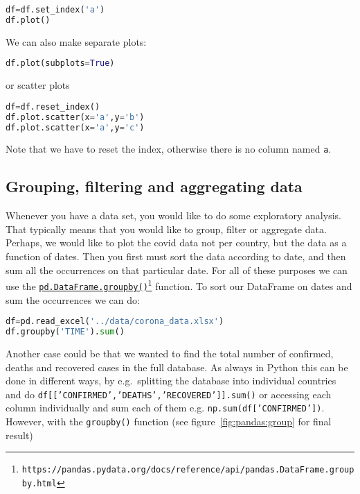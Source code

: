 \documentclass[graybox,sectrefs,envcountresetchap,open=right,final]{svmonodo}
\begin{document}
\begin{lstlisting}[language=python,style=blue1bar]
df=df.set_index('a')
df.plot()

\end{lstlisting}

We can also make separate plots:


\begin{lstlisting}[language=python,style=blue1bar]
df.plot(subplots=True)

\end{lstlisting}

or scatter plots




\begin{lstlisting}[language=python,style=blue1bar]
df=df.reset_index()
df.plot.scatter(x='a',y='b')
df.plot.scatter(x='a',y='c')

\end{lstlisting}

Note that we have to reset the index, otherwise there is no column named \texttt{a}. 

\subsection{Grouping, filtering and aggregating data}
Whenever you have a data set, you would like to do some exploratory analysis. That typically means that you would like to group, filter or aggregate data. Perhaps, we would like to plot the covid data not per country, but the data as a function of dates. Then you first must sort the data according to date, and then sum all the occurrences on that particular date. For all of these purposes we can use the \href{{https://pandas.pydata.org/docs/reference/api/pandas.DataFrame.groupby.html}}{\nolinkurl{pd.DataFrame.groupby()}\footnote{\texttt{https://pandas.pydata.org/docs/reference/api/pandas.DataFrame.groupby.html}}} function. To sort our DataFrame on dates and sum the occurrences we can do:



\begin{lstlisting}[language=python,style=blue1bar]
df=pd.read_excel('../data/corona_data.xlsx')
df.groupby('TIME').sum()

\end{lstlisting}


Another case could be that we wanted to find the total number of confirmed, deaths and recovered cases in the full database. As always in Python this can be done in different ways, by e.g.~splitting the database into individual countries and do  \texttt{df[['CONFIRMED','DEATHS','RECOVERED']].sum()} or accessing each column individually and sum each of them e.g. \texttt{np.sum(df['CONFIRMED'])}.  However, with the \texttt{groupby()} function
(see figure~\ref{fig:pandas:group} for final result)
\end{document}
